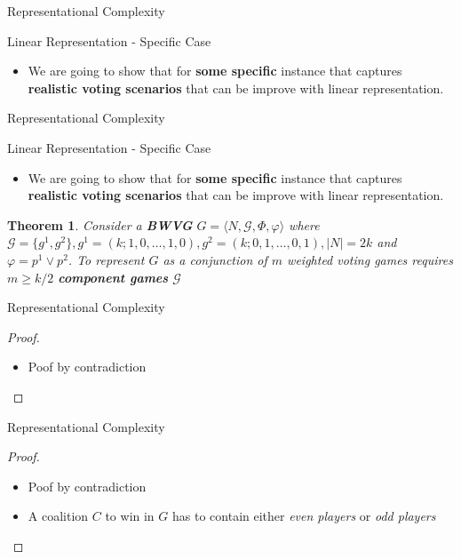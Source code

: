\documentclass{beamer}
\begin{document}
\begin{frame}[fragile]{Representational Complexity}
  \begin{block}{Linear Representation - Specific Case}    
    \begin{itemize}
      \item We are going to show that for \textbf{some specific} instance that captures \textbf{realistic voting scenarios} that can be improve with linear representation.
    \end{itemize}
  \end{block}
\end{frame}

\begin{frame}[fragile]{Representational Complexity}
  \begin{block}{Linear Representation - Specific Case}    
    \begin{itemize}
      \item We are going to show that for \textbf{some specific} instance that captures \textbf{realistic voting scenarios} that can be improve with linear representation.
    \end{itemize}
  \end{block}
  \newtheorem{theorem1}{Theorem}
  \begin{theorem1}
   Consider a \textbf{BWVG} $G = \langle N, \mathcal{G}, \Phi, \varphi \rangle$ where
   $\mathcal{G} = \{g^1, g^2\}, g^1 = (k; 1,0,\dots,1,0), g^2 = (k;0,1,\dots,0,1), |N| = 2k$
   and $\varphi = p^1 \lor p^2$. To represent $G$ as a conjunction of $m$ weighted voting games
   requires $m \geq k/2$ \textbf{component games} $\mathcal{G}$ 
  \end{theorem1}
\end{frame}

\begin{frame}[fragile]{Representational Complexity}
  \begin{proof}
    \begin{itemize}
      \item Poof by contradiction
    \end{itemize}
  \end{proof}
\end{frame}

\begin{frame}[fragile]{Representational Complexity}
  \begin{proof}
    \begin{itemize}
      \item Poof by contradiction
      \item A coalition $C$ to win in $G$ has to contain either \textit{even players} or \textit{odd players}
    \end{itemize}
  \end{proof}
\end{frame}
\end{document}
